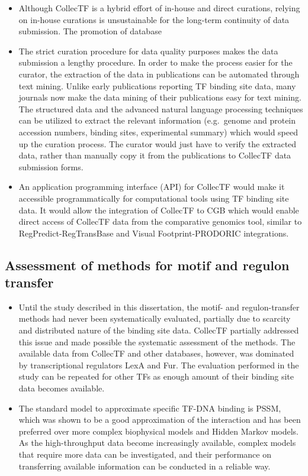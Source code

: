 \documentclass[12pt]{article}
\begin{document}
\begin{itemize}

\item Although CollecTF is a hybrid effort of in-house and direct curations,
  relying on in-house curations is unsustainable for the long-term continuity
  of data submission. The promotion of database

\item The strict curation procedure for data quality purposes makes the data
  submission a lengthy procedure. In order to make the process easier for the
  curator, the extraction of the data in publications can be automated through
  text mining. Unlike early publications reporting TF binding site data, many
  journals now make the data mining of their publications easy for text
  mining. The structured data and the advanced natural language processing
  techniques can be utilized to extract the relevant information (e.g.\ genome
  and protein accession numbers, binding sites, experimental summary) which
  would speed up the curation process. The curator would just have to verify
  the extracted data, rather than manually copy it from the publications to
  CollecTF data submission forms.

\item An application programming interface (API) for CollecTF would make it
  accessible programmatically for computational tools using TF binding site
  data. It would allow the integration of CollecTF to CGB which would enable
  direct access of CollecTF data from the comparative genomics tool, similar to
  RegPredict-RegTransBase and Visual Footprint-PRODORIC integrations.
\end{itemize}

\subsection{Assessment of methods for motif and regulon transfer}

\begin{itemize}

\item Until the study described in this dissertation, the motif- and
  regulon-transfer methods had never been systematically evaluated, partially
  due to scarcity and distributed nature of the binding site data. CollecTF
  partially addressed this issue and made possible the systematic assessment of
  the methods. The available data from CollecTF and other databases, however,
  was dominated by transcriptional regulators LexA and Fur. The evaluation
  performed in the study can be repeated for other TFs as enough amount of
  their binding site data becomes available.

\item The standard model to approximate specific TF-DNA binding is PSSM, which
  was shown to be a good approximation of the interaction and has been
  preferred over more complex biophysical models and Hidden Markov models. As
  the high-throughput data become increasingly available, complex models that
  require more data can be investigated, and their performance on transferring
  available information can be conducted in a reliable way.
\end{itemize}
\end{document}
